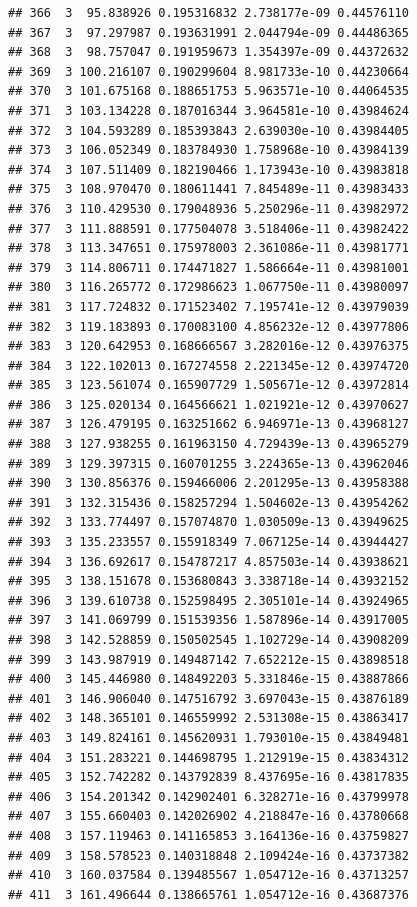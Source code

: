 \documentclass[article]{jss}\usepackage[]{graphicx}\usepackage[]{xcolor}
\makeatletter
\newenvironment{kframe}{%
 \def\at@end@of@kframe{}%
 \ifinner\ifhmode%
  \def\at@end@of@kframe{\end{minipage}}%
  \begin{minipage}{\columnwidth}%
 \fi\fi%
 \def\FrameCommand##1{\hskip\@totalleftmargin \hskip-\fboxsep
 \colorbox{shadecolor}{##1}\hskip-\fboxsep
     \hskip-\linewidth \hskip-\@totalleftmargin \hskip\columnwidth}%
 \MakeFramed {\advance\hsize-\width
   \@totalleftmargin\z@ \linewidth\hsize
   \@setminipage}}%
 {\par\unskip\endMakeFramed%
 \at@end@of@kframe}
\newenvironment{knitrout}{}{} %
\makeatother
\begin{document}
\begin{knitrout}
\begin{kframe}
\begin{verbatim}
## 366  3  95.838926 0.195316832 2.738177e-09 0.44576110
## 367  3  97.297987 0.193631991 2.044794e-09 0.44486365
## 368  3  98.757047 0.191959673 1.354397e-09 0.44372632
## 369  3 100.216107 0.190299604 8.981733e-10 0.44230664
## 370  3 101.675168 0.188651753 5.963571e-10 0.44064535
## 371  3 103.134228 0.187016344 3.964581e-10 0.43984624
## 372  3 104.593289 0.185393843 2.639030e-10 0.43984405
## 373  3 106.052349 0.183784930 1.758968e-10 0.43984139
## 374  3 107.511409 0.182190466 1.173943e-10 0.43983818
## 375  3 108.970470 0.180611441 7.845489e-11 0.43983433
## 376  3 110.429530 0.179048936 5.250296e-11 0.43982972
## 377  3 111.888591 0.177504078 3.518406e-11 0.43982422
## 378  3 113.347651 0.175978003 2.361086e-11 0.43981771
## 379  3 114.806711 0.174471827 1.586664e-11 0.43981001
## 380  3 116.265772 0.172986623 1.067750e-11 0.43980097
## 381  3 117.724832 0.171523402 7.195741e-12 0.43979039
## 382  3 119.183893 0.170083100 4.856232e-12 0.43977806
## 383  3 120.642953 0.168666567 3.282016e-12 0.43976375
## 384  3 122.102013 0.167274558 2.221345e-12 0.43974720
## 385  3 123.561074 0.165907729 1.505671e-12 0.43972814
## 386  3 125.020134 0.164566621 1.021921e-12 0.43970627
## 387  3 126.479195 0.163251662 6.946971e-13 0.43968127
## 388  3 127.938255 0.161963150 4.729439e-13 0.43965279
## 389  3 129.397315 0.160701255 3.224365e-13 0.43962046
## 390  3 130.856376 0.159466006 2.201295e-13 0.43958388
## 391  3 132.315436 0.158257294 1.504602e-13 0.43954262
## 392  3 133.774497 0.157074870 1.030509e-13 0.43949625
## 393  3 135.233557 0.155918349 7.067125e-14 0.43944427
## 394  3 136.692617 0.154787217 4.857503e-14 0.43938621
## 395  3 138.151678 0.153680843 3.338718e-14 0.43932152
## 396  3 139.610738 0.152598495 2.305101e-14 0.43924965
## 397  3 141.069799 0.151539356 1.587896e-14 0.43917005
## 398  3 142.528859 0.150502545 1.102729e-14 0.43908209
## 399  3 143.987919 0.149487142 7.652212e-15 0.43898518
## 400  3 145.446980 0.148492203 5.331846e-15 0.43887866
## 401  3 146.906040 0.147516792 3.697043e-15 0.43876189
## 402  3 148.365101 0.146559992 2.531308e-15 0.43863417
## 403  3 149.824161 0.145620931 1.793010e-15 0.43849481
## 404  3 151.283221 0.144698795 1.212919e-15 0.43834312
## 405  3 152.742282 0.143792839 8.437695e-16 0.43817835
## 406  3 154.201342 0.142902401 6.328271e-16 0.43799978
## 407  3 155.660403 0.142026902 4.218847e-16 0.43780668
## 408  3 157.119463 0.141165853 3.164136e-16 0.43759827
## 409  3 158.578523 0.140318848 2.109424e-16 0.43737382
## 410  3 160.037584 0.139485567 1.054712e-16 0.43713257
## 411  3 161.496644 0.138665761 1.054712e-16 0.43687376

\end{verbatim}
\end{kframe}
\end{knitrout}
\end{document}
